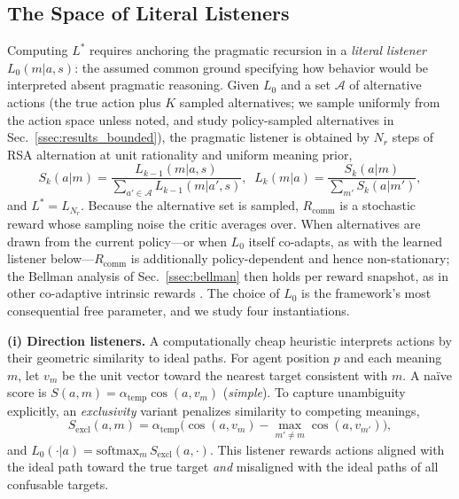 \documentclass{article}
\newcommand{\Rcomm}{R_{\text{comm}}}
\begin{document}
\subsection{The Space of Literal Listeners}
\label{ssec:listeners}

Computing $L^*$ requires anchoring the pragmatic recursion in a \emph{literal listener} $L_0(m|a,s)$: the assumed common ground specifying how behavior would be interpreted absent pragmatic reasoning. Given $L_0$ and a set $\mathcal{A}$ of alternative actions (the true action plus $K$ sampled alternatives; we sample uniformly from the action space unless noted, and study policy-sampled alternatives in Sec.~\ref{ssec:results_bounded}), the pragmatic listener is obtained by $N_r$ steps of RSA alternation at unit rationality and uniform meaning prior,
\begin{equation}
S_k(a|m) = \frac{L_{k-1}(m|a,s)}{\sum\limits_{a'\in\mathcal{A}} L_{k-1}(m|a',s)}, \;\;
L_k(m|a) = \frac{S_k(a|m)}{\sum\limits_{m'} S_k(a|m')}, \label{eq:rsa_recursion}
\end{equation}
and $L^* = L_{N_r}$. Because the alternative set is sampled, $\Rcomm$ is a stochastic reward whose sampling noise the critic averages over. When alternatives are drawn from the current policy---or when $L_0$ itself co-adapts, as with the learned listener below---$\Rcomm$ is additionally policy-dependent and hence non-stationary; the Bellman analysis of Sec.~\ref{ssec:bellman} then holds per reward snapshot, as in other co-adaptive intrinsic rewards \cite{eysenbach2019diversity}. The choice of $L_0$ is the framework's most consequential free parameter, and we study four instantiations.

\textbf{(i) Direction listeners.} A computationally cheap heuristic interprets actions by their geometric similarity to ideal paths. For agent position $p$ and each meaning $m$, let $v_m$ be the unit vector toward the nearest target consistent with $m$. A na\"ive score is $S(a,m) = \alpha_{\text{temp}}\cos(a, v_m)$ (\emph{simple}). To capture unambiguity explicitly, an \emph{exclusivity} variant penalizes similarity to competing meanings,
\begin{equation}
S_{\text{excl}}(a, m) = \alpha_{\text{temp}} \big( \cos(a, v_m) - \max_{m' \neq m} \cos(a, v_{m'}) \big), \label{eq:exclusivity}
\end{equation}
and $L_0(\cdot|a) = \mathrm{softmax}_m\, S_{\text{excl}}(a,\cdot)$. This listener rewards actions aligned with the ideal path toward the true target \emph{and} misaligned with the ideal paths of all confusable targets.
\end{document}
